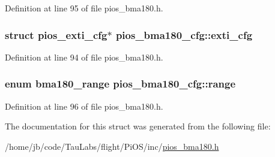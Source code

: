 \-Definition at line 95 of file pios\-\_\-bma180.\-h.

\hypertarget{structpios__bma180__cfg_a1fc7acd142e861f02f5f8a5b9364bedf}{
\subsubsection[{exti\-\_\-cfg}]{\setlength{\rightskip}{0pt plus 5cm}struct {\bf pios\-\_\-exti\-\_\-cfg}$\ast$ {\bf pios\-\_\-bma180\-\_\-cfg\-::exti\-\_\-cfg}}}\label{structpios__bma180__cfg_a1fc7acd142e861f02f5f8a5b9364bedf}


\-Definition at line 94 of file pios\-\_\-bma180.\-h.

\hypertarget{structpios__bma180__cfg_ab6de89aba289da9930b188f183765921}{
\subsubsection[{range}]{\setlength{\rightskip}{0pt plus 5cm}enum {\bf bma180\-\_\-range} {\bf pios\-\_\-bma180\-\_\-cfg\-::range}}}\label{structpios__bma180__cfg_ab6de89aba289da9930b188f183765921}


\-Definition at line 96 of file pios\-\_\-bma180.\-h.



\-The documentation for this struct was generated from the following file\-:\begin{DoxyCompactItemize}
\item 
/home/jb/code/\-Tau\-Labs/flight/\-Pi\-O\-S/inc/\hyperlink{pios__bma180_8h}{pios\-\_\-bma180.\-h}\end{DoxyCompactItemize}
